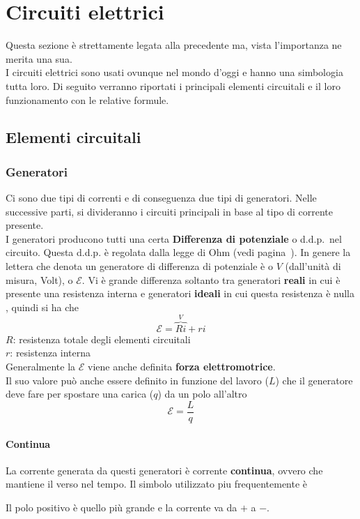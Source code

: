 
\section{Circuiti elettrici}\label{sec:circElettr}
Questa sezione è strettamente legata alla precedente ma, vista l'importanza ne merita una sua.\\
I circuiti elettrici sono usati ovunque nel mondo d'oggi e hanno una simbologia tutta loro. Di 
seguito verranno riportati i principali elementi circuitali e il loro funzionamento con le relative
formule.

\subsection{Elementi circuitali}

\subsubsection{Generatori}
Ci sono due tipi di correnti e di conseguenza due tipi di generatori. Nelle successive parti, si
divideranno i circuiti principali in base al tipo di corrente presente.\\
I generatori producono tutti una certa \textbf{Differenza di potenziale} o d.d.p.\ nel circuito.
Questa d.d.p. è regolata dalla legge di Ohm (vedi pagina~\pageref{par:circElettr:elem:res:ohm}). 
In genere la
lettera che denota un generatore di differenza di potenziale è o $V$ (dall'unità di misura, Volt),
o $\mathcal{E}$. Vi è grande differenza soltanto tra generatori \textbf{reali} in cui
è presente una resistenza interna e generatori \textbf{ideali} in cui questa resistenza è nulla , 
quindi si ha che
\begin{equation*}
  \mathcal{E} = \overbrace{Ri}^{V} + ri
\end{equation*}
$R$: resistenza totale degli elementi circuitali\\
$r$: resistenza interna\\ [\baselineskip]
Generalmente la $\mathcal{E}$ viene anche definita \textbf{forza elettromotrice}.\\
Il suo valore può anche essere definito in funzione del lavoro ($L$) che il generatore deve
fare per spostare una carica ($q$) da un polo all'altro
\begin{equation*}
  \mathcal{E} = \frac{L}{q}
\end{equation*}

\paragraph{Continua}
La corrente generata da questi generatori è corrente \textbf{continua}, ovvero che mantiene il
verso nel tempo. Il simbolo utilizzato piu frequentemente è
\begin{center}
\end{center}
Il polo positivo è quello più grande e la corrente va da $+$ a $-$.

